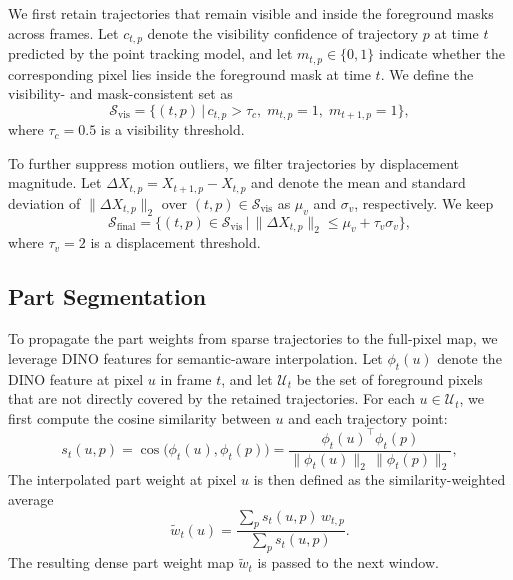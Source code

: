 We first retain trajectories that remain visible and inside the foreground masks across frames. 
Let $c_{t,p}$ denote the visibility confidence of trajectory $p$ at time $t$ predicted by the point tracking model, and let $m_{t,p} \in \{0,1\}$ indicate whether the corresponding pixel lies inside the foreground mask at time $t$. 
We define the visibility- and mask-consistent set as
\begin{equation}
    \mathcal{S}_{\mathrm{vis}}
    = \big\{ (t,p) \,\big|\,
        c_{t,p} > \tau_c,\;
        m_{t,p} = 1,\;
        m_{t+1,p} = 1
      \big\},
\end{equation}
where $\tau_c=0.5$ is a visibility threshold.

To further suppress motion outliers, we filter trajectories by displacement magnitude. 
Let $\Delta X_{t,p} = X_{t+1,p} - X_{t,p}$ and denote the mean and standard deviation of $\lVert \Delta X_{t,p} \rVert_2$ over $(t,p) \in \mathcal{S}_{\mathrm{vis}}$ as $\mu_v$ and $\sigma_v$, respectively. 
We keep
\begin{equation*}
    \mathcal{S}_{\mathrm{final}}
    = \big\{ (t,p) \in \mathcal{S}_{\mathrm{vis}} \,\big|\,
        \lVert \Delta X_{t,p} \rVert_2 
        \le \mu_v + \tau_v \sigma_v
      \big\},
\end{equation*}
where $\tau_v=2$ is a displacement threshold. 

\subsection{Part Segmentation}
\label{sec:partseg}
To propagate the part weights from sparse trajectories to the full-pixel map, we leverage DINO features for semantic-aware interpolation. 
Let $\phi_t(u)$ denote the DINO feature at pixel $u$ in frame $t$, and let $\mathcal{U}_t$ be the set of foreground pixels that are not directly covered by the retained trajectories. 
For each $u \in \mathcal{U}_t$, we first compute the cosine similarity between $u$ and each trajectory point:
\begin{equation*}
    s_t(u,p)
    = \cos\!\big(\phi_t(u), \phi_t(p)\big)
    = \frac{\phi_t(u)^\top \phi_t(p)}
           {\lVert \phi_t(u) \rVert_2 \,\lVert \phi_t(p) \rVert_2},
\end{equation*}
The interpolated part weight at pixel $u$ is then defined as the similarity-weighted average
\begin{equation*}
    \tilde{w}_t(u)
    = \frac{
        \sum_p
        s_t(u,p)\, w_{t,p}
    }{
        \sum_p
        s_t(u,p)
    }.
\end{equation*}
The resulting dense part weight map $\tilde{w}_t$ is passed to the next window.

